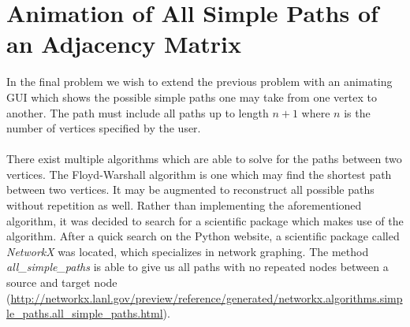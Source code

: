 \section{Animation of All Simple Paths of an Adjacency Matrix} %
\label{sec:animation_of_all_simple_paths_of_an_adjacency_matrix}
In the final problem we wish to extend the previous problem with an animating GUI which shows the possible simple paths one may take from one vertex to another. The path must include all paths up to length $n+1$ where $n$ is the number of vertices specified by the user.\\\\
There exist multiple algorithms which are able to solve for the paths between two vertices. The Floyd-Warshall algorithm is one which may find the shortest path between two vertices. It may be augmented to reconstruct all possible paths without repetition as well. Rather than implementing the aforementioned algorithm, it was decided to search for a scientific package which makes use of the algorithm. After a quick search on the Python website, a scientific package called \emph{NetworkX} was located, which specializes in network graphing. The method \emph{all\_simple\_paths} is able to give us all paths with no repeated nodes between a source and target node (\url{http://networkx.lanl.gov/preview/reference/generated/networkx.algorithms.simple_paths.all_simple_paths.html}).

